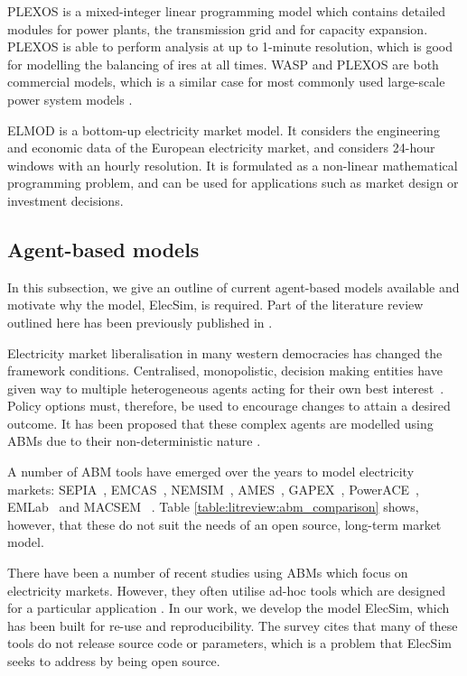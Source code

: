 PLEXOS is a mixed-integer linear programming model which contains detailed modules for power plants, the transmission grid and for capacity expansion. PLEXOS is able to perform analysis at up to 1-minute resolution, which is good for modelling the balancing of \acrshort{ires} at all times. WASP and PLEXOS are both commercial models, which is a similar case for most commonly used large-scale power system models \cite{Pfenninger2014}.

ELMOD is a bottom-up electricity market model. It considers the engineering and economic data of the European electricity market, and considers 24-hour windows with an hourly resolution. It is formulated as a non-linear mathematical programming problem, and can be used for applications such as market design or investment decisions.


\subsection*{Agent-based models}

In this subsection, we give an outline of current agent-based models available and motivate why the model, ElecSim, is required. Part of the literature review outlined here has been previously published in \cite{Kell}.

Electricity market liberalisation in many western democracies has changed the framework conditions. Centralised, monopolistic, decision making entities have given way to multiple heterogeneous agents acting for their own best interest~\cite{Most2010}. Policy options must, therefore, be used to encourage changes to attain a desired outcome. It has been proposed that these complex agents are modelled using ABMs due to their non-deterministic nature \cite{Kell}. 

A number of ABM tools have emerged over the years to model electricity markets: SEPIA~\cite{Harp2000}, EMCAS~\cite{Conzelmann}, NEMSIM~\cite{Batten2006}, AMES~\cite{Sun2007}, GAPEX~\cite{Cincotti2013}, PowerACE~\cite{Rothengatter2007}, EMLab~\cite{Chappin2017} and MACSEM ~\cite{Praca2003}. Table \ref{table:litreview:abm_comparison} shows, however, that these do not suit the needs of an open source, long-term market model. 

There have been a number of recent studies using ABMs which focus on electricity markets. However, they often utilise ad-hoc tools which are designed for a particular application \cite{Saxena2019, hadar2019, Kunzel2018}. In our work, we develop the model ElecSim, which has been built for re-use and reproducibility. The survey \cite{Weidlich2008} cites that many of these tools do not release source code or parameters, which is a problem that ElecSim seeks to address by being open source.

